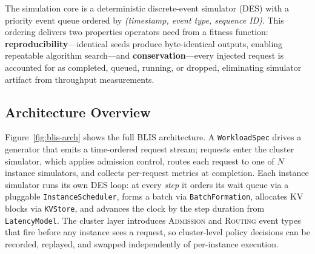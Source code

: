 \documentclass[11pt]{article}
\theoremstyle{plain} %
\theoremstyle{definition} %
\theoremstyle{remark} %
\newcommand{\code}[1]{\texttt{#1}}
\numberwithin{equation}{section}
\begin{document}
The simulation core is a deterministic discrete-event simulator (DES) with a
priority event queue ordered by \emph{(timestamp, event type, sequence ID)}.
This ordering delivers two properties operators need from a fitness function:
\textbf{reproducibility}---identical seeds produce byte-identical outputs, enabling
repeatable algorithm search---and \textbf{conservation}---every injected request
is accounted for as completed, queued, running, or dropped, eliminating simulator
artifact from throughput measurements.

\subsection{Architecture Overview}
\label{subsec:design-arch}

Figure~\ref{fig:blis-arch} shows the full BLIS architecture.
A \code{WorkloadSpec} drives a generator that emits a time-ordered request stream;
requests enter the cluster simulator, which applies admission control, routes each
request to one of $N$ instance simulators, and collects per-request metrics at
completion.
Each instance simulator runs its own DES loop: at every \emph{step} it orders its
wait queue via a pluggable \code{InstanceScheduler}, forms a batch via
\code{BatchFormation}, allocates KV blocks via \code{KVStore}, and advances the
clock by the step duration from \code{LatencyModel}.
The cluster layer introduces \textsc{Admission} and \textsc{Routing} event types
that fire before any instance sees a request, so cluster-level policy decisions
can be recorded, replayed, and swapped independently of per-instance execution.
\end{document}
